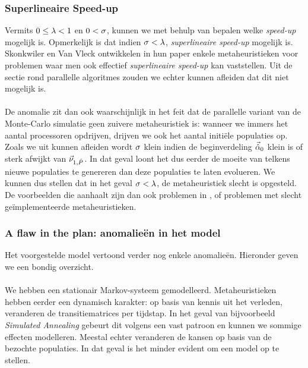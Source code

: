 \subsubsection{Superlineaire Speed-up}

Vermits $0\leq\metapb<1$ en $0<\metapa$, kunnen we met behulp van  bepalen welke \emph{speed-up} mogelijk is. Opmerkelijk is dat indien $\metapa<\metapb$, \emph{superlineaire speed-up} mogelijk is. Skonkwiler en Van Vleck ontwikkelen in hun paper\cite{DBLP:journals/jc/ShonkwilerV94} enkele metaheuristieken voor problemen waar men ook effectief \emph{superlineaire speed-up} kan vaststellen. Uit de sectie rond parallelle algoritmes zouden we echter kunnen afleiden dat dit niet mogelijk is.

\paragraph{}
De anomalie zit dan ook waarschijnlijk in het feit dat de parallelle variant van de Monte-Carlo simulatie geen zuivere metaheuristiek is: wanneer we immers het aantal processoren opdrijven, drijven we ook het aantal initi\"ele populaties op. Zoals we uit  kunnen afleiden wordt $\metapa$ klein indien de beginverdeling $\probdistnormmeta{0}$ klein is of sterk afwijkt van $\evr[1,\removmat]$. In dat geval loont het dus eerder de moeite van telkens nieuwe populaties te genereren dan deze populaties te laten evolueren. We kunnen dus stellen dat in het geval $\metapa<\metapb$, de metaheuristiek slecht is opgesteld. De voorbeelden die \cite{DBLP:journals/jc/ShonkwilerV94} aanhaalt zijn dan ook problemen in , of problemen met slecht ge\"implementeerde metaheuristieken.

\subsubsection{A flaw in the plan: anomalie\"en in het model}

Het voorgestelde model vertoond verder nog enkele anomalie\"en. Hieronder geven we een bondig overzicht.

\paragraph{}
We hebben een stationair Markov-systeem gemodelleerd. Metaheuristieken hebben eerder een dynamisch karakter: op basis van kennis uit het verleden, veranderen de transitiematrices per tijdstap. In het geval van bijvoorbeeld \emph{Simulated Annealing} gebeurt dit volgens een vast patroon en kunnen we sommige effecten modelleren\cite{}. Meestal echter veranderen de kansen op basis van de bezochte populaties. In dat geval is het minder evident om een model op te stellen.

